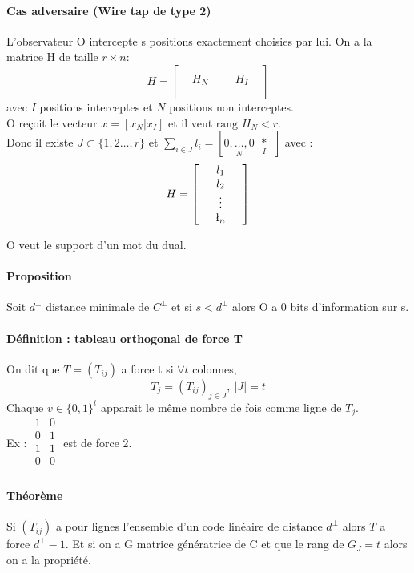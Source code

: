 \documentclass[12pt,a4paper]{report}
\begin{document}
\paragraph{Cas adversaire (Wire tap de type 2)\\}
L'observateur O intercepte s positions exactement choisies par lui. On a la matrice H  de taille $r \times n$:
$$ H = \left[ \begin{array}{ccc|ccc}
 & & & & & \\
& H_N & & & H_I & \\
 & & & & & \\
\end{array} \right]$$
avec $I$ positions interceptes et $N$ positions non interceptes.\\
O reçoit le vecteur $x = [x_N | x_I] $ et il veut $\mbox{rang } H_N < r$.\\
Donc il existe $J \subset \{1,2\ldots,r\}$ et $\displaystyle \sum_{i\in J } l_i = [\underset{N}{0, \ldots, 0}\underset{I}{\ \ * \ \ }]$ avec : 
$$ H =\left[ \begin{array}{ccc}
& l_1 & \\
& l_2 & \\
& \vdots & \\
& \l_n & \\
\end{array}\right] $$

O veut le support d'un mot du dual.
\paragraph{Proposition\\}
Soit $d^{\perp}$ distance minimale de $C^{\perp}$ et si $s < d^{\perp}$ alors O a 0 bits d'information sur s.
\paragraph{Définition : tableau orthogonal de force T\\}
On dit que $T=(T_{ij})$ a force t si $\forall t$ colonnes,
$$ T_j=(T_{ij})_{j\in J}, \ |J|=t $$
Chaque $v \in \{0,1\}^t$ apparait le même nombre de fois comme ligne de $T_j$.\\
Ex : $\begin{array}{cc}
1 & 0 \\
0 & 1 \\
1 & 1 \\
0 & 0 \\\end{array}$ est de force 2.
\paragraph{Théorème\\}
Si $(T_{ij})$ a pour lignes l'ensemble d'un code linéaire de distance $d^{\perp}$  alors $T$ a force $d^{\perp} -1$. Et si on a G matrice génératrice de C et que le rang de $G_J = t$ alors on a la propriété.
\end{document}
